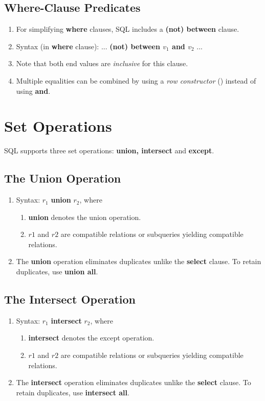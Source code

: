 \documentclass[journal,12pt,twocolumn]{IEEEtran}
\begin{document}
\subsection{Where-Clause Predicates}
\begin{enumerate}
    \item For simplifying \textbf{where} clauses, SQL includes a \textbf{(not) 
    between} clause.
    \item Syntax (in \textbf{where} clause): ... \textbf{(not) between $v_1$ 
    and $v_2$} ...
    \item Note that both end values are \textit{inclusive} for this clause.
    \item Multiple equalities can be combined by using a \textit{row constructor}
    () instead of using \textbf{and}.
\end{enumerate}

\section{Set Operations}

SQL supports three set operations: \textbf{union, intersect} and \textbf{except}.

\subsection{The Union Operation}
\begin{enumerate}
    \item Syntax: $r_1$ \textbf{union} $r_2$, where
    \begin{enumerate}
        \item \textbf{union} denotes the union operation.
        \item $r1$ and $r2$ are compatible relations or subqueries yielding 
        compatible relations.
    \end{enumerate}
    \item The \textbf{union} operation eliminates duplicates unlike the 
    \textbf{select} clause. To retain duplicates, use \textbf{union all}.
\end{enumerate}

\subsection{The Intersect Operation}
\begin{enumerate}
    \item Syntax: $r_1$ \textbf{intersect} $r_2$, where
    \begin{enumerate}
        \item \textbf{intersect} denotes the except operation.
        \item $r1$ and $r2$ are compatible relations or subqueries yielding 
        compatible relations.
    \end{enumerate}
    \item The \textbf{intersect} operation eliminates duplicates unlike the 
    \textbf{select} clause. To retain duplicates, use \textbf{intersect all}.
\end{enumerate}
\end{document}
